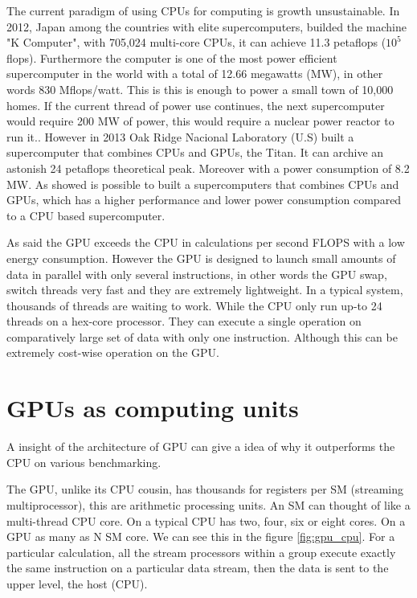 The current paradigm of using CPUs for computing is growth unsustainable. In 2012, Japan among the countries with elite supercomputers, builded the machine "K Computer", with 705,024 multi-core CPUs, it can achieve 11.3 petaflops ($10^5$ flops). Furthermore the computer is one of the most power efficient supercomputer in the world with a total of 12.66 megawatts (MW), in other words 830 Mflops/watt. This is this is enough to power a small town of 10,000 homes. If the current thread of power use continues, the next supercomputer would require 200 MW of power, this would require a nuclear power reactor to run it.\cite{whatexascale}. However in 2013 Oak Ridge Nacional Laboratory (U.S) built a supercomputer that combines CPUs and GPUs, the Titan. It can archive an astonish 24 petaflops theoretical peak. Moreover with a power consumption of 8.2 MW. As showed is possible to built a supercomputers that combines CPUs and GPUs, which has a higher performance and lower power consumption compared to a CPU based supercomputer. \cite{titan}

As said the GPU exceeds the CPU in calculations per second FLOPS with a low energy consumption. However the GPU is designed to launch small amounts of data in parallel with only several instructions, in other words the GPU swap, switch threads very fast and they are extremely lightweight. In a typical system, thousands of threads are waiting to work. While the CPU only run up-to 24 threads on a hex-core processor. They can execute a single operation on comparatively large set of data with only one instruction. Although this can be extremely cost-wise operation on the GPU.

\section{GPUs as computing units}

A insight of the architecture of GPU can give a idea of  why it outperforms the CPU on various benchmarking.

The GPU, unlike its CPU cousin, has thousands for registers per SM (streaming multiprocessor), this are arithmetic processing units. An SM can thought of like a multi-thread CPU core. On a typical CPU has two, four, six or eight cores. On a GPU as many as N SM core. We can see this in the figure \ref{fig:gpu_cpu}. For a particular calculation, all the stream
processors within a group execute exactly the same instruction on a particular data stream, then the data is sent to the upper level, the host (CPU). \cite{cook}

